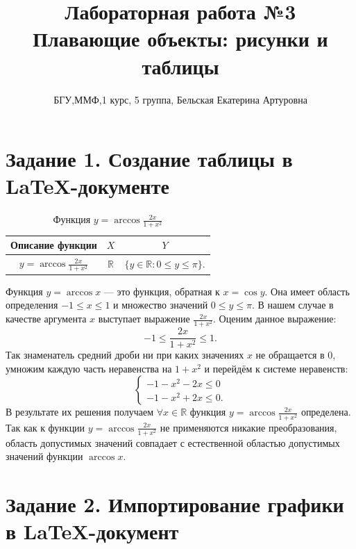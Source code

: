 \documentclass[a4paper,12pt]{article}
\title{Лабораторная работа №3\\Плавающие объекты: рисунки и таблицы}
\author{БГУ,ММФ,1 курс, 5 группа, Бельская Екатерина Артуровна}
\begin{document}
\maketitle
\section*{Задание 1. Создание таблицы в \LaTeX-документе}

\begin{table}[h!]
\caption{Функция $y=\arccos \frac{2x}{1+x^2}$}
\centering

\begin{tabular}{|c|c|c|}

\hline
Описание функции & $X$ & $Y$\\
\hline \hline
$y=\arccos \frac{2x}{1+x^2}$ & $\mathbb{R}$ & $
\lbrace y\in \mathbb{R} : 0\leqslant y\leqslant \pi\rbrace .$ \\
\hline

\end{tabular}
\label{table:tabl}
\end{table}
Функция $y=\arccos x$ --- это функция, обратная к $x=\cos y$. Она имеет область определения $-1\leqslant x\leqslant 1$ и множество значений $0\leqslant y\leqslant \pi$. В нашем случае в качестве аргумента $x$ выступает выражение $\frac{2x}{1+x^2}$. Оценим данное выражение:
\begin{equation}
	-1\leqslant \frac{2x}{1+x^2}\leqslant 1.
\end{equation} 
Так знаменатель средний дроби ни при каких значениях $x$ не обращается в 0, умножим каждую часть неравенства на ${1+x^2}$ и перейдём к системе неравенств:
\[\left \lbrace
\begin{array}{ll}
-1-x^2-2x\leqslant 0\\
-1-x^2+2x\leqslant0.
\end{array}\right.\]
В результате их решения получаем $\forall x\in\mathbb{R}$ функция $y=\arccos \frac{2x}{1+x^2}$ определена.
\\Так как к функции $y=\arccos \frac{2x}{1+x^2}$ не применяются никакие преобразования, область допустимых значений совпадает с естественной областью допустимых значений функции $\arccos x$.
\newpage
\section*{Задание 2. Импортирование графики в \LaTeX-документ}
\end{document}
